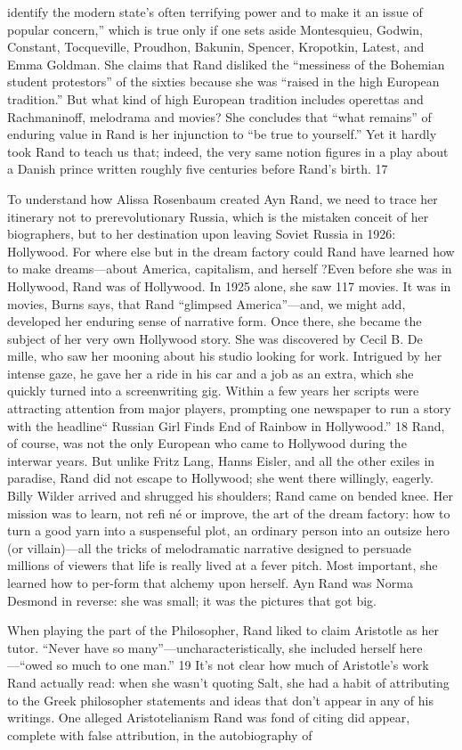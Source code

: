 identify the modern state’s often terrifying power and to make it an issue of popular concern,” which is true only if one sets aside Montesquieu, Godwin, Constant, Tocqueville, Proudhon, Bakunin, Spencer, Kropotkin, Latest, and Emma Goldman. She claims that Rand disliked the “messiness of the Bohemian student protestors” of the sixties because she was “raised in the high European tradition.” But what kind of high European tradition includes operettas and Rachmaninoff, melodrama and movies? She concludes that “what remains” of enduring value in Rand is her injunction to “be true to yourself.” Yet it hardly took Rand to teach us that; indeed, the very same notion figures in a play about a Danish prince written roughly five centuries before Rand’s birth. {\color{blue} 17 } {\par} To understand how Alissa Rosenbaum created Ayn Rand, we need to trace her itinerary not to prerevolutionary Russia, which is the mistaken conceit of her biographers, but to her destination upon leaving Soviet Russia in 1926: Hollywood. For where else but in the dream factory could Rand have learned how to make dreams—about America, capitalism, and herself ?Even before she was in Hollywood, Rand was of Hollywood. In 1925 alone, she saw {\color{blue} 117 } movies. It was in movies, Burns says, that Rand “glimpsed America”—and, we might add, developed her enduring sense of narrative form. Once there, she became the subject of her very own Hollywood story. She was discovered by Cecil B. De mille, who saw her mooning about his studio looking for work. Intrigued by her intense gaze, he gave her a ride in his car and a job as an extra, which she quickly turned into a screenwriting gig. Within a few years her scripts were attracting attention from major players, prompting one newspaper to run a story with the headline“ Russian Girl Finds End of Rainbow in Hollywood.” {\color{blue} 18 } Rand, of course, was not the only European who came to Hollywood during the interwar years. But unlike Fritz Lang, Hanns Eisler, and all the other exiles in paradise, Rand did not escape to Hollywood; she went there willingly, eagerly. Billy Wilder arrived and shrugged his shoulders; Rand came on bended knee. Her mission was to learn, not refi né or improve, the art of the dream factory: how to turn a good yarn into a suspenseful plot, an ordinary person into an outsize hero (or villain)—all the tricks of melodramatic narrative designed to persuade millions of viewers that life is really lived at a fever pitch. Most important, she learned how to per-form that alchemy upon herself. Ayn Rand was Norma Desmond in reverse: she was small; it was the pictures that got big.{\par} When playing the part of the Philosopher, Rand liked to claim Aristotle as her tutor. “Never have so many”—uncharacteristically, she included herself here—“owed so much to one man.” {\color{blue} 19 } It’s not clear how much of Aristotle’s work Rand actually read: when she wasn’t quoting Salt, she had a habit of attributing to the Greek philosopher statements and ideas that don’t appear in any of his writings. One alleged Aristotelianism Rand was fond of citing did appear, complete with false attribution, in the autobiography of 